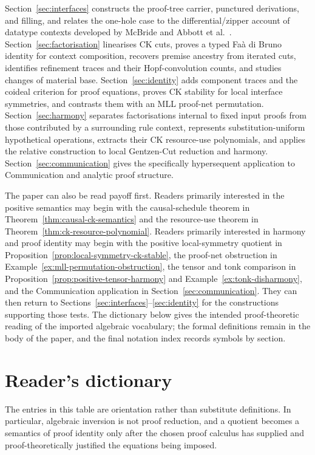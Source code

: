 \documentclass[10pt,a4paper]{article}
\theoremstyle{plain}
\theoremstyle{definition}
\theoremstyle{remark}
\begin{document}
Section~\ref{sec:interfaces} constructs the proof-tree carrier, punctured
derivations, and filling, and relates the one-hole case to the
differential/zipper account of datatype contexts developed by McBride and
Abbott et al.~\cite{mcbride2001,abbott2003derivatives}.
Section~\ref{sec:factorisation} linearises CK cuts,
proves a typed Fa\`a di Bruno identity for context composition, recovers
premise ancestry from iterated cuts, identifies refinement traces and their
Hopf-convolution counts, and studies changes of material base.
Section~\ref{sec:identity} adds component traces and the coideal criterion
for proof equations, proves CK stability for local interface symmetries, and
contrasts them with an MLL proof-net permutation.  Section~\ref{sec:harmony} separates factorisations
internal to fixed input proofs from those contributed by a surrounding rule
context, represents substitution-uniform hypothetical operations, extracts
their CK resource-use polynomials, and applies the relative construction to
local Gentzen-Cut reduction and harmony.
Section~\ref{sec:communication} gives the specifically hypersequent
application to Communication and analytic proof structure.

The paper can also be read payoff first.  Readers primarily interested in
the positive semantics may begin with the causal-schedule theorem in
Theorem~\ref{thm:causal-ck-semantics} and the resource-use theorem in
Theorem~\ref{thm:ck-resource-polynomial}.  Readers primarily interested in
harmony and proof identity may begin with the positive local-symmetry quotient
in Proposition~\ref{prop:local-symmetry-ck-stable}, the proof-net obstruction in
Example~\ref{ex:mll-permutation-obstruction}, the tensor and \(\mathbin{\mathrm{tonk}}\)
comparison in Proposition~\ref{prop:positive-tensor-harmony} and
Example~\ref{ex:tonk-disharmony}, and the Communication application in
Section~\ref{sec:communication}.  They can then return to
Sections~\ref{sec:interfaces}--\ref{sec:identity} for the constructions
supporting those tests.  The dictionary below gives the intended
proof-theoretic reading of the imported algebraic vocabulary; the formal
definitions remain in the body of the paper, and the final notation index
records symbols by section.

\section*{Reader's dictionary}

The entries in this table are orientation rather than substitute
definitions.  In particular, algebraic inversion is not proof reduction,
and a quotient becomes a semantics of proof identity only after the chosen
proof calculus has supplied and proof-theoretically justified the equations
being imposed.
\end{document}
